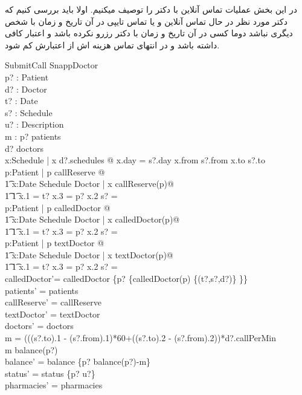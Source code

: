 \documentclass{article}
\begin{document}
در این بخش عملیات تماس آنلاین با دکتر را توصیف میکنیم. اولا باید بررسی کنیم که دکتر مورد نظر در حال تماس آنلاین و یا تماس تایپی در آن تاریخ و زمان با شخص دیگری نباشد دوما کسی در آن تاریخ و زمان با دکتر رزرو نکرده باشد و اعتبار کافی داشته باشد و در انتهای تماس هزینه اش از اعتبارش کم شود.
\begin{schema}{SubmitCall}
\Delta SnappDoctor\\
p? : Patient\\
d? : Doctor\\
t? : Date\\
s? : Schedule\\
u? : Description\\
m : \nat
\where
p? \in patients\\
d? \in doctors\\
\exists x:Schedule | x \in d?.schedules @ x.day = s?.day \land x.from \le s?.from \land x.to \ge s?.to\\
\forall p:Patient | p \in callReserve @ \\
\t1 \forall x:Date \cross Schedule \cross Doctor | x \in callReserve(p)@\\
\t1 \t1 x.1 = t? \land x.3 = p? \implies x.2 \cap s? = \emptyset\\

\forall p:Patient | p \in calledDoctor @ \\
\t1 \forall x:Date \cross Schedule \cross Doctor | x \in calledDoctor(p)@\\
\t1 \t1 x.1 = t? \land x.3 = p? \implies x.2 \cap s? = \emptyset\\

\forall p:Patient | p \in textDoctor @ \\
\t1 \forall x:Date \cross Schedule \cross Doctor | x \in textDoctor(p)@\\
\t1 \t1 x.1 = t? \land x.3 = p? \implies x.2 \cap s? = \emptyset\\

calledDoctor'= calledDoctor \oplus \{p? \mapsto \{calledDoctor(p) \cup \{(t?,s?,d?)\} \}\}\\

patients' = patients\\ 
callReserve' = callReserve\\
textDoctor' = textDoctor\\
doctors' = doctors\\
m = (((s?.to).1 - (s?.from).1)*60+((s?.to).2 - (s?.from).2))*d?.callPerMin \\
m \le balance(p?)\\
balance' = balance \oplus \{p? \mapsto balance(p?)-m\} \\
status' = status \oplus \{p? \mapsto u?\}\\
pharmacies' = pharmacies
\end{schema}
\end{document}
